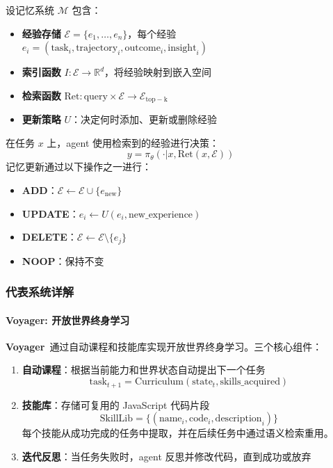 \begin{definition}[记忆进化框架]
设记忆系统 $\mathcal{M}$ 包含：
\begin{itemize}
\item \textbf{经验存储} $\mathcal{E} = \{e_1, \ldots, e_n\}$，每个经验 $e_i = (\text{task}_i, \text{trajectory}_i, \text{outcome}_i, \text{insight}_i)$
\item \textbf{索引函数} $I: \mathcal{E} \rightarrow \mathbb{R}^d$，将经验映射到嵌入空间
\item \textbf{检索函数} $\text{Ret}: \text{query} \times \mathcal{E} \rightarrow \mathcal{E}_{\mathrm{top-k}}$
\item \textbf{更新策略} $U$：决定何时添加、更新或删除经验
\end{itemize}
在任务 $x$ 上，agent 使用检索到的经验进行决策：
\begin{equation}
y = \pi_\theta(\cdot | x, \text{Ret}(x, \mathcal{E}))
\label{eq:memory-retrieval}
\end{equation}
记忆更新通过以下操作之一进行：
\begin{itemize}
\item \textbf{ADD}：$\mathcal{E} \leftarrow \mathcal{E} \cup \{e_{\mathrm{new}}\}$
\item \textbf{UPDATE}：$e_i \leftarrow U(e_i, \text{new\_experience})$
\item \textbf{DELETE}：$\mathcal{E} \leftarrow \mathcal{E} \setminus \{e_j\}$
\item \textbf{NOOP}：保持不变
\end{itemize}
\end{definition}

\subsubsection{代表系统详解}

\paragraph{Voyager: 开放世界终身学习}

\textbf{Voyager}~\citep{voyager2023}通过自动课程和技能库实现开放世界终身学习。三个核心组件：

\begin{enumerate}
\item \textbf{自动课程}：根据当前能力和世界状态自动提出下一个任务
\begin{equation}
\text{task}_{t+1} = \text{Curriculum}(\text{state}_t, \text{skills\_acquired})
\label{eq:voyager-curriculum}
\end{equation}

\item \textbf{技能库}：存储可复用的 JavaScript 代码片段
\begin{equation}
\text{SkillLib} = \{(\text{name}_i, \text{code}_i, \text{description}_i)\}
\label{eq:voyager-skills}
\end{equation}
每个技能从成功完成的任务中提取，并在后续任务中通过语义检索重用。

\item \textbf{迭代反思}：当任务失败时，agent 反思并修改代码，直到成功或放弃
\end{enumerate}

